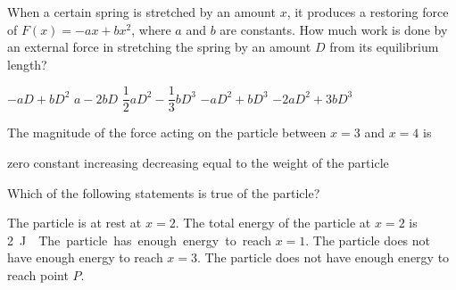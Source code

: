 \documentclass[12pt]{../../oss-apphys-exam}
\begin{document}
\begin{questions}
  \question When a certain spring is stretched by an amount $x$, it produces a
  restoring force of $F(x)=-ax+bx^2$, where $a$ and $b$ are constants. How much
  work is done by an external force in stretching the spring by an amount $D$
  from its equilibrium length?
  \begin{choices}
    \choice $-aD + bD^2$
    \choice $a - 2bD$
    \choice $\dfrac12aD^2-\dfrac13 bD^3$
    \choice $-aD^2 + bD^3$
    \choice $-2aD^2 + 3bD^3$
  \end{choices}
  \newpage
  

  \question The magnitude of the force acting on the particle between $x=3$ and
  $x=4$ is
  \label{conserve1}
  \begin{choices}
    \choice zero
    \choice constant
    \choice increasing
    \choice decreasing
    \choice equal to the weight of the particle
  \end{choices}

  \question Which of the following statements is true of the particle?
  \label{conserve2}
  \begin{choices}
    \choice The particle is at rest at $x=2$.
    \choice The total energy of the particle at $x=2$ is \SI{+2}\joule.
    \choice The particle has enough energy to reach $x=1$.
    \choice The particle does not have enough energy to reach $x=3$.
    \choice The particle does not have enough energy to reach point $P$.
  \end{choices}
  \newpage
  

\end{questions}
\end{document}
